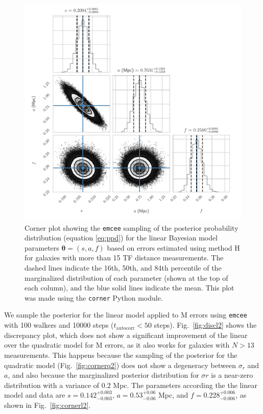 \documentclass[a4paper,fleqn,usenatbib]{mnras}
\begin{document}
\begin{figure}
	\includegraphics[scale=0.7]{cornerl}
    \caption{Corner plot showing the \texttt{emcee} sampling of the posterior probability distribution (equation \ref{eq:ppd}) for the linear Bayesian model parameters $\pmb{\theta}=(s,a,f)$ based on errors estimated using method H for galaxies with more than 15 TF distance measurements. The dashed lines indicate the 16th, 50th, and 84th percentile of the marginalized distribution of each parameter (shown at the top of each column), and the blue solid lines indicate the mean. This plot was made using the \texttt{corner} Python module.}
    \label{fig:cornerl}
\end{figure}
We sample the posterior for the linear model applied to M errors using \texttt{emcee} with 100 walkers and 10000 steps ($t_\mathrm{autocorr} < 50$ steps). Fig.~\ref{fig:discl2} shows the discrepancy plot, which does not show a significant improvement of the linear over the quadratic model for M errors, as it also works for galaxies with $N>13$ measurements. This happens because the sampling of the posterior for the quadratic model (Fig.~\ref{fig:cornerq2}) does not show a degeneracy between $\sigma_r$ and $a$, and also because the marginalized posterior distribution for $\sigma r$ is a near-zero distribution with a variance of $0.2$ Mpc. The parameters according the the linear model and data are $s=0.142_{-0.003}^{+0.003}$, $a=0.53_{-0.06}^{+0.06}$ Mpc, and $f=0.228_{-0.006}^{+0.006}$, as shown in Fig.~\ref{fig:cornerl2}. 
\end{document}
